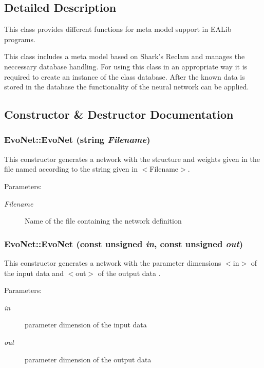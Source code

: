 \subsection{Detailed Description}
This class provides different functions for meta model support in EALib programs.

This class includes a meta model based on Shark's Reclam and manages the neccessary database handling. For using this class in an appropriate way it is required to create an instance of the class database. After the known data is stored in the database the functionality of the neural network can be applied. 



\subsection{Constructor \& Destructor Documentation}
\subsubsection{\setlength{\rightskip}{0pt plus 5cm}Evo\-Net::Evo\-Net (string {\em Filename})}\label{classEvoNet_a1}


This constructor generates a network with the structure and weights given in the file named according to the string given in $<$Filename$>$.

\begin{Desc}
\item[Parameters: ]\par
\begin{description}
\item[{\em 
Filename}]Name of the file containing the network definition \end{description}
\end{Desc}
\subsubsection{\setlength{\rightskip}{0pt plus 5cm}Evo\-Net::Evo\-Net (const unsigned {\em in}, const unsigned {\em out})}\label{classEvoNet_a2}


This constructor generates a network with the parameter dimensions $<$in$>$ of the input data and $<$out$>$ of the output data .

\begin{Desc}
\item[Parameters: ]\par
\begin{description}
\item[{\em 
in}]parameter dimension of the input data \item[{\em 
out}]parameter dimension of the output data \end{description}
\end{Desc}
